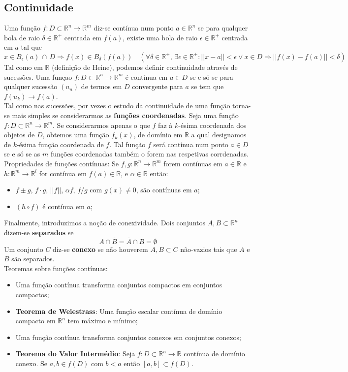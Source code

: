 \documentclass{article}
\begin{document}
\subsection{Continuidade}
Uma função $f: D \subset \mathbb{R}^n \to \mathbb{R}^m$ diz-se contínua num ponto $a \in \mathbb{R}^n$ se para qualquer bola de raio $\delta \in \mathbb{R}^+$ centrada em $f(a)$, existe uma bola de raio $\epsilon \in \mathbb{R}^+$ centrada em $a$ tal que 
$$x \in B_\epsilon(a) \, \cap \, D \Rightarrow f(x) \in B_\delta(f(a)) \quad (\forall \delta \in \mathbb{R}^+, \, \exists \epsilon \in \mathbb{R}^+ : ||x-a|| < \epsilon \vee x \in D \Rightarrow ||f(x)-f(a)|| < \delta)$$
Tal como em $\mathbb{R}$ (definição de Heine), podemos definir continuidade através de sucessões. Uma funçao $f : D \subset \mathbb{R}^n \to \mathbb{R}^m$ é contínua em $a \in D$ se e só se para qualquer sucessão $(u_n)$ de termos em $D$ convergente para $a$ se tem que $f(u_k) \to f(a)$.\\
Tal como nas sucessões, por vezes o estudo da continuidade de uma função torna-se mais simples se considerarmos as \textbf{funções coordenadas}. Seja uma função $f: D \subset \mathbb{R}^n \to \mathbb{R}^m$. Se considerarmos apenas o que $f$ faz à $k$-ésima coordenada dos objetos de $D$, obtemos uma função $f_k(x)$, de domínio em $\mathbb{R}$ a qual designamos de $k$-ésima função coordenada de $f$. Tal função $f$ será contínua num ponto $a \in D$ se e só se as $m$ funções coordenadas também o forem nas respetivas corrdenadas.\\
Propriedades de funções contínuas:
Se $f,g: \mathbb{R}^n \to \mathbb{R}^m$ forem contínuas em $a \in \mathbb{R}$ e $h: \mathbb{R}^m \to \mathbb{R}^l$ for contínua em $f(a) \in \mathbb{R}$, e $\alpha \in \mathbb{R}$ então:
\begin{itemize}
	\item $f \pm g$, $f \cdot g$, $||f||$, $\alpha f$, $f/g$ com $g(x) \neq 0$, são contínuas em $a$;
	\item $(h \circ f)$ é contínua em $a$;
\end{itemize}
Finalmente, introduzimos a noção de conexividade. Dois conjuntos $A,B \subset \mathbb{R}^n$ dizem-se \textbf{separados} se 
$$
A \cap \overline{B} = \overline{A} \cap B = \emptyset
$$
Um conjunto $C$ diz-se \textbf{conexo} se não houverem $A,B \subset C$ não-vazios tais que $A$ e $B$ são separados.\\
Teoremas sobre funções contínuas:
\begin{itemize}
	\item Uma função contínua transforma conjuntos compactos em conjuntos compactos;
	\item \textbf{Teorema de Weiestrass}: Uma função escalar contínua de domínio compacto em $\mathbb{R}^n$ tem máximo e mínimo;
	\item Uma função contínua transforma conjuntos conexos em conjuntos conexos;
	\item \textbf{Teorema do Valor Intermédio}: Seja $f : D \subset \mathbb{R}^n \to \mathbb{R}$ contínua de domínio conexo. Se $a,b \in f(D)$ com $b<a$ então $[a,b] \subset f(D)$.
\end{itemize}
\end{document}
